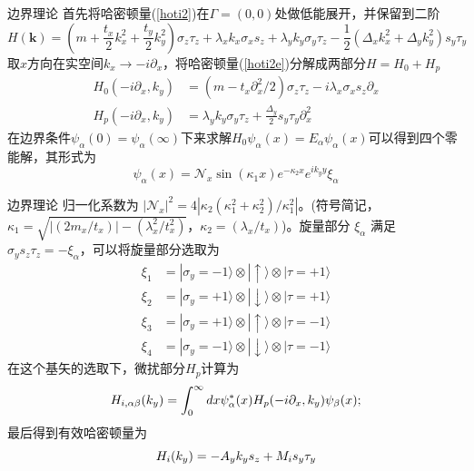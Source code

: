 \documentclass[10pt,aspectratio=169]{beamer} %
\begin{document}
\begin{frame}{边界理论}
首先将哈密顿量(\ref{hoti2})在$\Gamma=(0,0)$处做低能展开，并保留到二阶
\begin{equation}
H(\mathbf{k})=(m+\frac{t_x}{2}k_x^2+\frac{t_y}{2}k_y^2)\sigma_z\tau_z+\lambda_xk_x\sigma_xs_z+\lambda_yk_y\sigma_y\tau_z-\frac{1}{2}(\Delta_xk_x^2+\Delta_yk_y^2)s_y\tau_y\label{hoti2e}
\end{equation}
取$x$方向在实空间$k_x\rightarrow-i\partial_x$，将哈密顿量(\ref{hoti2e})分解成两部分$H=H_0+H_p$
\begin{equation}
\begin{aligned}
H_0(-i\partial_x,k_y)&=(m-t_x\partial_x^2/2)\sigma_z\tau_z-i\lambda_x\sigma_xs_z\partial_x\\
H_p(-i\partial_x,k_y)&=\lambda_yk_y\sigma_y\tau_z+\frac{\Delta_y}{2}s_y\tau_y\partial_x^2
\end{aligned}
\end{equation}
在边界条件$\psi_\alpha(0)=\psi_\alpha(\infty)$下来求解$H_0\psi_\alpha(x)=E_\alpha\psi_\alpha(x)$可以得到四个零能解，其形式为
\begin{equation}
\psi_\alpha(x)=\mathcal{N}_x\sin(\kappa_1x)e^{-\kappa_2x}e^{ik_yy}\xi_\alpha
\end{equation}
\end{frame}
\begin{frame}{边界理论}
归一化系数为 $|\mathcal{N}_x|^2=4|\kappa_2(\kappa_1^2+\kappa_2^2)/\kappa_1^2|$。(符号简记，$\kappa_1=\sqrt{|(2m_x/t_x)|-(\lambda_x^2/t_x^2)}$，$ \kappa_2=(\lambda_x/t_x)$)。旋量部分 $\xi_\alpha$ 满足 $\sigma_ys_z\tau_z=-\xi_\alpha$，可以将旋量部分选取为
\begin{equation}
\begin{aligned}
\xi_1&=|\sigma_y=-1\rangle\otimes|\uparrow\rangle\otimes|\tau=+1\rangle\\
\xi_2&=|\sigma_y=+1\rangle\otimes|\downarrow\rangle\otimes|\tau=+1\rangle\\
\xi_3&=|\sigma_y=+1\rangle\otimes|\uparrow\rangle\otimes|\tau=-1\rangle\\
\xi_4&=|\sigma_y=-1\rangle\otimes|\downarrow\rangle\otimes|\tau=-1\rangle
\end{aligned}
\end{equation}
在这个基矢的选取下，微扰部分$H_p$计算为
\begin{equation}
H_{\uppercase\expandafter{\romannumeral1},\alpha\beta}(k_y)=\int_{0}^{\infty}dx\psi^*_\alpha(x)H_p(-i\partial_x,k_y)\psi_\beta(x);
\end{equation}
最后得到有效哈密顿量为
\begin{equation}
H_{\uppercase\expandafter{\romannumeral1}}(k_y)=-A_yk_ys_z+M_{\uppercase\expandafter{\romannumeral1}}s_y\tau_y
\end{equation}	
\end{frame}
\end{document}
